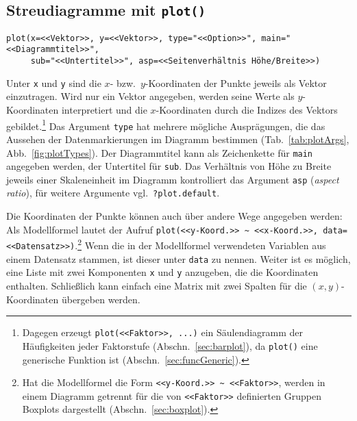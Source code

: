 \subsection{Streudiagramme mit \texttt{plot()}}

\begin{lstlisting}
plot(x=<<Vektor>>, y=<<Vektor>>, type="<<Option>>", main="<<Diagrammtitel>>",
     sub="<<Untertitel>>", asp=<<Seitenverhältnis Höhe/Breite>>)
\end{lstlisting}

Unter \lstinline!x! und \lstinline!y! sind die $x$- bzw.\ $y$-Koordinaten der Punkte jeweils als Vektor einzutragen. Wird nur ein Vektor angegeben, werden seine Werte als $y$-Koordinaten interpretiert und die $x$-Koordinaten durch die Indizes des Vektors gebildet.\footnote{Dagegen erzeugt \lstinline!plot(<<Faktor>>, ...)! ein Säulendiagramm der Häufigkeiten jeder Faktorstufe (Abschn.\ \ref{sec:barplot}), da \lstinline!plot()! eine generische Funktion ist (Abschn.\ \ref{sec:funcGeneric}).} Das Argument \lstinline!type! hat mehrere mögliche Ausprägungen, die das Aussehen der Datenmarkierungen im Diagramm bestimmen (Tab.\ \ref{tab:plotArgs}, Abb.\ \ref{fig:plotTypes}). Der Diagrammtitel kann als Zeichenkette für \lstinline!main! angegeben werden, der Untertitel für \lstinline!sub!. Das Verhältnis von Höhe zu Breite jeweils einer Skaleneinheit im Diagramm kontrolliert das Argument \lstinline!asp! (\emph{aspect ratio}), für weitere Argumente vgl.\ \lstinline!?plot.default!.

Die Koordinaten der Punkte können auch über andere Wege angegeben werden: Als Modellformel lautet der Aufruf \lstinline!plot(<<y-Koord.>> ~ <<x-Koord.>>, data=<<Datensatz>>)!.\footnote{Hat die Modellformel die Form \lstinline!<<y-Koord.>> ~ <<Faktor>>!, werden in einem Diagramm getrennt für die von \lstinline!<<Faktor>>! definierten Gruppen Boxplots dargestellt (Abschn.\ \ref{sec:boxplot}).} Wenn die in der Modellformel verwendeten Variablen aus einem Datensatz stammen, ist dieser unter \lstinline!data! zu nennen. Weiter ist es möglich, eine Liste mit zwei Komponenten \lstinline!x! und \lstinline!y! anzugeben, die die Koordinaten enthalten. Schließlich kann einfach eine Matrix mit zwei Spalten für die $(x, y)$-Koordinaten übergeben werden.

